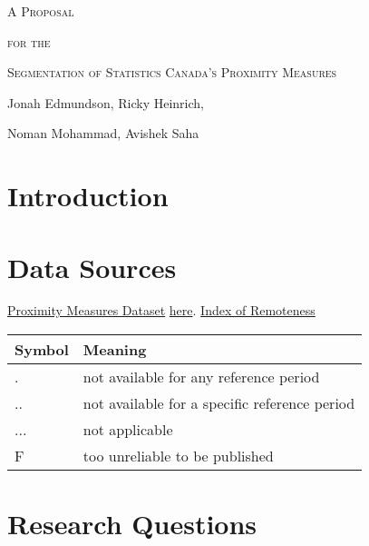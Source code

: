 \documentclass[11pt, a4paper]{article}
\begin{document}
\begin{center}
\Large{\textsc{A Proposal}}
\par
\small{\textsc{for the}}
\par
\Large{\textsc{Segmentation of Statistics Canada’s Proximity Measures}}
\par
\vspace{1.5pc}
\par
\small
Jonah Edmundson, Ricky Heinrich, \par Noman Mohammad, Avishek Saha
\end{center}
\vspace{2pc} %
\normalsize



\section*{Introduction}






\section*{Data Sources}




\href{https://www150.statcan.gc.ca/n1/pub/17-26-0002/2020001/csv/pmd-eng.zip}{Proximity Measures Dataset}
\href{https://www150.statcan.gc.ca/n1/pub/71-607-x/71-607-x2020011-eng.htm}{here}.
\href{https://www150.statcan.gc.ca/n1/pub/17-26-0001/172600012020001-eng.htm}{Index of Remoteness}


\begin{table}[H]
\centering
\begin{tabular}{|l|l|} 
\hline
\textbf{Symbol} & \textbf{Meaning} \\
\hline
. & not available for any reference period \\ 
\hline 
.. & not available for a specific reference period \\ 
\hline 
... & not applicable \\ 
\hline 
F & too unreliable to be published \\ 
\hline 
\end{tabular}
\end{table}



\section*{Research Questions}
\end{document}
